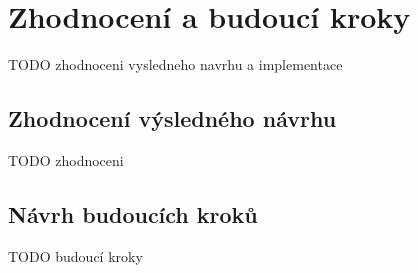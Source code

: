 \chapter{Zhodnocení a budoucí kroky}
TODO zhodnoceni vysledneho navrhu a implementace
\section{Zhodnocení výsledného návrhu}
    TODO zhodnoceni

\section{Návrh budoucích kroků}
    TODO budoucí kroky